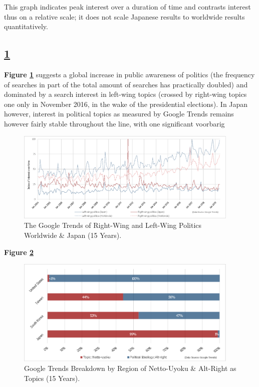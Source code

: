 \documentclass[10pt,british,A4paper,,openany]{memoir}
\begin{document}
This graph indicates peak interest over a duration of time and contrasts
interest thus on a relative scale; it does not scale Japanese results to
worldwide results quantitatively.

\subsection{\texorpdfstring{\ref{fig:politictrends}}{}}\label{section-1}

\textbf{Figure \ref{fig:politictrends}} suggests a global increase in
public awareness of politics (the frequency of searches in part of the
total amount of searches has practically doubled) and dominated by a
search interest in left-wing topics (crossed by right-wing topics one
only in November 2016, in the wake of the presidential elections). In
Japan however, interest in political topics as measured by Google Trends
remains however fairly stable throughout the line, with one significant
voorbarig

\begin{figure}[!htb]
 \caption{\label{fig:politictrends} The Google Trends of Right-Wing and Left-Wing Politics Worldwide \& Japan (15 Years).}
 \centering 
 \includegraphics[width=0.95\textwidth,trim=4 4 4 4,clip]{images/politictrends.eps}
\end{figure}

\textbf{Figure \ref{fig:netto-altright}}

\begin{figure}[!htb]
 \caption{\label{fig:netto-altright} Google Trends Breakdown by Region of Netto-Uyoku \& Alt-Right as Topics (15 Years).}
 \centering
 \includegraphics[width=0.95\textwidth,trim=4 4 4 4,clip]{images/netto-altright.eps}
\end{figure}
\end{document}

